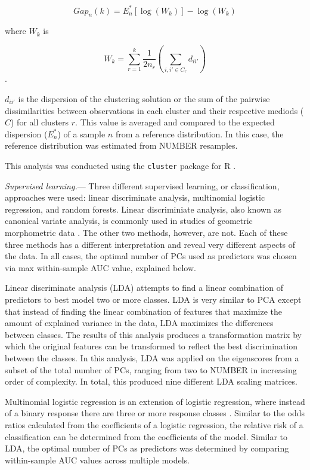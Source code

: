 \documentclass[12pt,letterpaper]{article}
\renewcommand{\subsubsection}[1]{%
\vspace{2ex}
\noindent
\textit{#1.}---}
\begin{document}
\[Gap_{n}(k) = E^{*}_{n}[\log(W_{k})] - \log(W_{k})\] 

where \(W_{k}\) is

\[W_{k} = \sum^{k}_{r = 1}{\frac{1}{2n_{r}} (\sum_{i,i' \in C_{r}} d_{ii'})}\].

\(d_{ii'}\) is the dispersion of the clustering solution or the sum of the pairwise dissimilarities between observations in each cluster and their respective mediods (\(C\)) for all clusters \(r\). This value is averaged and compared to the expected dispersion (\(E^{*}_{n}\)) of a sample \(n\) from a reference distribution. In this case, the reference distribution was estimated from NUMBER resamples.

This analysis was conducted using the \texttt{cluster} package for R \citep{Maechler2013}.

\subsubsection{Supervised learning}
Three different supervised learning, or classification, approaches were used: linear discriminate analysis, multinomial logistic regression, and random forests. Linear discriminiate analysis, also known as canonical variate analysis, is commonly used in studies of geometric morphometric data \citep{Zelditch2004,Mitteroecker2011}. The other two methods, however, are not. Each of these three methods has a different interpretation and reveal very different aspects of the data. In all cases, the optimal number of PCs used as predictors was chosen via max within-sample AUC value, explained below.

Linear discriminate analysis (LDA) attempts to find a linear combination of predictors to best model two or more classes. LDA is very similar to PCA except that instead of finding the linear combination of features that maximize the amount of explained variance in the data, LDA maximizes the differences between classes. The results of this analysis produces a transformation matrix by which the original features can be transformed to reflect the best discrimination between the classes. In this analysis, LDA was applied on the eigenscores from a subset of the total number of PCs, ranging from two to NUMBER in increasing order of complexity. In total, this produced nine different LDA scaling matrices. 

Multinomial logistic regression is an extension of logistic regression, where instead of a binary response there are three or more response classes \citep{Venables2002a}. Similar to the odds ratios calculated from the coefficients of a logistic regression, the relative risk of a classification can be determined from the coefficients of the model. Similar to LDA, the optimal number of PCs as predictors was determined by comparing within-sample AUC values across multiple models.  %
\end{document}
